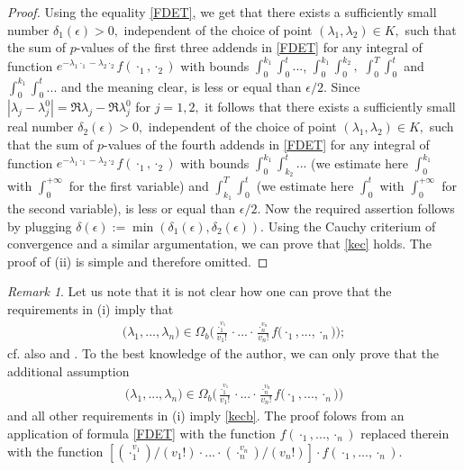 \documentclass{amsart}
\theoremstyle{definition}
\theoremstyle{remark}
\newtheorem{rem}[thm]{Remark}
\numberwithin{equation}{section}
\begin{document}
\begin{proof}
Using the equality \eqref{FDET}, we get that there exists a sufficiently small number $\delta_{1}(\epsilon)>0,$ independent of the choice of point $(\lambda_{1},\lambda_{2})\in K,$ such that the sum of  $p$-values of the first three addends in \eqref{FDET} for any integral of function $e^{-\lambda_{1}\cdot_{1}-\lambda_{2}\cdot_{2}}f( \cdot_{1},\cdot_{2})$ with bounds $\int^{k_{1}}_{0}\int^{t}_{0}...$, $\int^{k_{1}}_{0}\int^{k_{2}}_{0},$ $ \int^{T}_{0}\int^{t}_{0}$ and $\int^{k_{1}}_{0}\int^{t}_{0}...$ and the meaning clear, is less or equal than $\epsilon/2.$  Since $|\lambda_{j}-\lambda_{j}^{0}|=\Re \lambda_{j}-\Re \lambda_{j}^{0}$ for $j=1,2,$ it follows that there exists a sufficiently small real number $\delta_{2}(\epsilon)>0,$ independent of the choice of point $(\lambda_{1},\lambda_{2})\in K,$ such that the sum of  $p$-values of the fourth addends in \eqref{FDET} for any integral of function $e^{-\lambda_{1}\cdot_{1}-\lambda_{2}\cdot_{2}}f( \cdot_{1},\cdot_{2})$ with bounds $\int^{k_{1}}_{0}\int^{t}_{k_{2}}...$ (we estimate here $\int^{k_{1}}_{0}$ with $\int^{+\infty}_{0}$ for the first variable) and $\int_{k_{1}}^{T}\int^{t}_{0}$ (we estimate here $\int^{t}_{0}$ with $\int^{+\infty}_{0}$ for the second variable), is less or equal than $\epsilon/2.$  Now the required assertion follows by plugging $\delta(\epsilon):=\min(\delta_{1}(\epsilon),\delta_{2}(\epsilon)).$ Using the Cauchy criterium of convergence and a similar argumentation, we can prove that \eqref{kec} holds.
 The proof of (ii) is simple and therefore omitted.
\end{proof}

\begin{rem}\label{neide}
Let us note that it is not clear how one can prove that the requirements in (i) imply that
\begin{align} \label{kecb}
\bigl(\lambda_{1},...,\lambda_{n}\bigr)\in \Omega_{b}\Biggl(\frac{\cdot_{1}^{v_{1}}}{v_{1}!}\cdot ...\cdot\frac{\cdot_{n}^{v_{n}}}{v_{n}!}f\bigl( \cdot_{1},...,\cdot_{n}\bigr)\Biggr);
\end{align} 
cf. also \cite[Theorem 2.1(d)-(e)]{bern1} and \cite{amerio}. To the best knowledge of the author, we can only prove that the additional assumption
\begin{align*}
\bigl(\lambda_{1},...,\lambda_{n}\bigr)\in \Omega_{b} \Biggl(\frac{\cdot_{1}^{v_{1}}}{v_{1}!}\cdot ...\cdot\frac{\cdot_{n}^{v_{n}}}{v_{n}!}f\bigl( \cdot_{1},...,\cdot_{n}\bigr)\Biggr)
\end{align*} 
and all other requirements in (i) imply \eqref{kecb}.
The proof folows from an application of formula \eqref{FDET} with the function $f(\cdot_{1},...,\cdot_{n})$ replaced therein with the function $[(\cdot_{1}^{v_{1}})/(v_{1}!)\cdot ...\cdot (\cdot_{n}^{v_{n}})/(v_{n}!)]\cdot f( \cdot_{1},...,\cdot_{n}).$ 
\end{rem}
\end{document}
